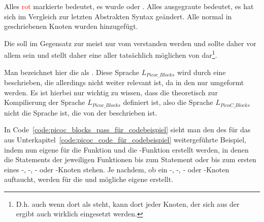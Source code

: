 \begin{grammar}
  \toprule
  \commentsecond*
  \midrule
  \arith*
  \midrule
  \logic*
  \midrule
  \assign*
  \midrule
  \pntrshrinkafter*
  \midrule
  \arraysecond*
  \midrule
  \struct*
  \midrule
  \ifelseblocks*
  \midrule
  \loopblocks*
  \midrule
  \funafter*
  \midrule
  \block
  \midrule
  \file*
  \bottomrule
\end{grammar}

\begin{Special_Paragraph}
  Alles \textcolor{red}{rot} markierte bedeutet, es wurde  oder . Alles \textcolor{gray!90!black}{ausgegraute} bedeutet, es hat sich im Vergleich zur letzten Abstrakten Syntax  geändert. Alle normal in  geschriebenen Knoten wurden  hinzugefügt.

  Die  soll im Gegensatz zur  meist nur vom  verstanden werden und sollte daher vor allem  sein und stellt daher eine  aller tatsächlich möglichen  von  dar\footnote{D.h. auch wenn dort  als  steht, kann dort  jeder Knoten, der sich aus der   ergibt auch wirklich eingesetzt werden.}.

  Man bezeichnet hier die  als . Diese Sprache $L_{Picoc\_Blocks}$ wird durch eine  beschrieben, die allerdings nicht weiter relevant ist, da in den  nur  umgeformt werden. Es ist hierbei nur wichtig zu wissen, dass die  theoretisch zur Kompilierung der Sprache $L_{Picoc\_Blocks}$ definiert ist, also die Sprache $L_{PicoC\_Blocks}$ nicht die Sprache ist, die von der  beschrieben ist.
\end{Special_Paragraph}


In Code~\ref{code:picoc_blocks_pass_für_codebeispiel} sieht man den  des  für das aus Unterkapitel~\ref{code:picoc_code_für_codebeispiel} weitergeführte Beispiel, indem nun eigene  für die Funktion  und die -Funktion erstellt werden, in denen die  Statements der jeweiligen Funktionen bis zum  Statement oder bis zum ersten  eines -, -, - oder -Knoten stehen. Je nachdem, ob ein -, -, - oder -Knoten auftaucht, werden für die  und mögliche  eigene  erstellt.

